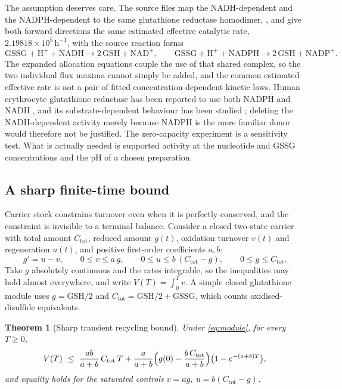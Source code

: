 \documentclass[11pt,a4paper]{article}
\theoremstyle{plain}
\newtheorem{theorem}{Theorem}[section]
\theoremstyle{definition}
\theoremstyle{remark}
\newcommand{\Ctot}{C_{\mathrm{tot}}}
\begin{document}
The assumption deserves care. The source files map the NADH-dependent
 and the NADPH-dependent  to the same glutathione
reductase homodimer, , and give both forward
directions the same estimated effective catalytic rate,
$2.19818\times10^{5}\,\mathrm h^{-1}$, with the source reaction forms
\[
\mathrm{GSSG}+\mathrm H^++\mathrm{NADH}\to2\,\mathrm{GSH}+\mathrm{NAD}^+,
\qquad
\mathrm{GSSG}+\mathrm H^++\mathrm{NADPH}\to2\,\mathrm{GSH}+\mathrm{NADP}^+ .
\]
The expanded allocation equations couple the use of that shared complex, so the
two individual flux maxima cannot simply be added, and the common estimated
effective rate is not a pair of fitted concentration-dependent kinetic laws.
Human erythrocyte glutathione reductase has been reported to use both NADPH and
NADH \citep{nakashima1976}, and its substrate-dependent behaviour has been
studied \citep{wong1989}; deleting the NADH-dependent activity merely because
NADPH is the more familiar donor would therefore not be justified. The
zero-capacity experiment is a sensitivity test. What is actually needed is
supported activity at the nucleotide and GSSG concentrations and the pH of a
chosen preparation.

\subsection{A sharp finite-time bound}
Carrier stock constrains turnover even when it is perfectly conserved, and the
constraint is invisible to a terminal balance. Consider a closed two-state
carrier with total amount $\Ctot$, reduced amount $g(t)$, oxidation turnover
$v(t)$ and regeneration $u(t)$, and positive first-order coefficients $a,b$:
\begin{equation}\label{eq:module}
g'=u-v,\qquad 0\le v\le a\,g,\qquad 0\le u\le b\,(\Ctot-g),\qquad
0\le g\le \Ctot .
\end{equation}
Take $g$ absolutely continuous and the rates integrable, so the inequalities
may hold almost everywhere, and write $V(T)=\int_0^Tv$. A simple closed
glutathione module uses $g=\mathrm{GSH}/2$ and
$\Ctot=\mathrm{GSH}/2+\mathrm{GSSG}$, which counts oxidised-disulfide
equivalents.

\begin{theorem}[Sharp transient recycling bound]\label{thm:carrier}
Under \eqref{eq:module}, for every $T\ge0$,
\begin{equation}\label{eq:sharp}
V(T)\ \le\ \frac{ab}{a+b}\,\Ctot\,T
+\frac{a}{a+b}\Bigl(g(0)-\frac{b\,\Ctot}{a+b}\Bigr)
\bigl(1-e^{-(a+b)T}\bigr),
\end{equation}
and equality holds for the saturated controls $v=ag$, $u=b(\Ctot-g)$.
\end{theorem}
\end{document}
